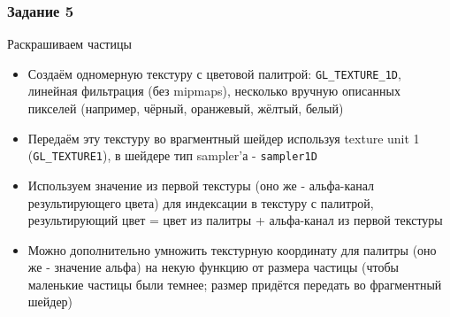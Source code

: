\documentclass{beamer}
\begin{document}
\begin{frame}[fragile]
\frametitle{Задание 5}
Раскрашиваем частицы
\begin{itemize}
\item Создаём одномерную текстуру с цветовой палитрой: \verb|GL_TEXTURE_1D|, линейная фильтрация (без mipmaps), несколько вручную описанных пикселей (например, чёрный, оранжевый, жёлтый, белый)
\pause
\item Передаём эту текстуру во врагментный шейдер используя texture unit 1 (\verb|GL_TEXTURE1|), в шейдере тип sampler'а - \verb|sampler1D|
\pause
\item Используем значение из первой текстуры (оно же - альфа-канал результирующего цвета) для индексации в текстуру с палитрой, результирующий цвет = цвет из палитры + альфа-канал из первой текстуры
\pause
\item Можно дополнительно умножить текстурную координату для палитры (оно же - значение альфа) на некую функцию от размера частицы (чтобы маленькие частицы были темнее; размер придётся передать во фрагментный шейдер)
\end{itemize}
\end{frame}
\end{document}
